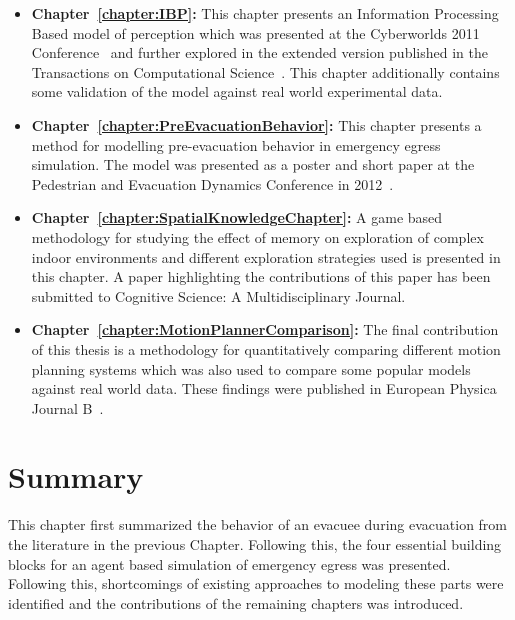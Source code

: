 \begin{itemize}
    \item \textbf{Chapter~\ref{chapter:IBP}:} This chapter presents an Information Processing Based model of perception which was presented at the Cyberworlds 2011 Conference~\cite{Viswanathan:2011uy} and further explored in the extended version published in the Transactions on Computational Science~\cite{Viswanathan:ut}. This chapter additionally contains some validation of the model against real world experimental data.
    \item \textbf{Chapter~\ref{chapter:PreEvacuationBehavior}:} This chapter presents a method for modelling pre-evacuation behavior in emergency egress simulation. The model was presented as a poster and short paper at the Pedestrian and Evacuation Dynamics Conference in 2012~\cite{Viswanathan:2012vt}.
    \item \textbf{Chapter~\ref{chapter:SpatialKnowledgeChapter}:} A game based methodology for studying the effect of memory on exploration of complex indoor environments and different exploration strategies used is presented in this chapter. A paper highlighting the contributions of this paper has been submitted to Cognitive Science: A Multidisciplinary Journal.
    \item \textbf{Chapter~\ref{chapter:MotionPlannerComparison}:} The final contribution of this thesis is a methodology for quantitatively comparing different motion planning systems which was also used to compare some popular models against real world data. These findings were published in European Physica Journal B~\cite{Viswanathan:2014}.
\end{itemize}


\section{Summary}
\label{IBEVAC:Summary}


This chapter first summarized the behavior of an evacuee during evacuation from the literature in the previous Chapter. Following this, the four essential building blocks for an agent based simulation of emergency egress was presented. Following this, shortcomings of existing approaches to modeling these parts were identified and the contributions of the remaining chapters was introduced.